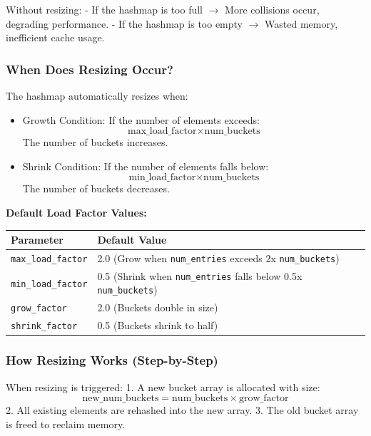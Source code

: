 \documentclass[titlepage]{article}
\begin{document}
Without resizing:
- If the hashmap is too full $\rightarrow$ More collisions occur, degrading performance.
- If the hashmap is too empty $\rightarrow$ Wasted memory, inefficient cache usage.

\subsubsection{When Does Resizing Occur?}
The hashmap automatically resizes when:
\begin{itemize}
    \item Growth Condition: If the number of elements exceeds:
    \[
    \text{max\_load\_factor} \times \text{num\_buckets}
    \]
    The number of buckets increases.
    \item Shrink Condition: If the number of elements falls below:
    \[
    \text{min\_load\_factor} \times \text{num\_buckets}
    \]
    The number of buckets decreases.
\end{itemize}

\textbf{Default Load Factor Values:}
\begin{center}
\begin{tabular}{@{} l l @{} }
\toprule
\textbf{Parameter} & \textbf{Default Value} \\
\midrule
\texttt{max\_load\_factor} & 2.0 (Grow when \texttt{num\_entries} exceeds 2x \texttt{num\_buckets}) \\
\texttt{min\_load\_factor} & 0.5 (Shrink when \texttt{num\_entries} falls below 0.5x \texttt{num\_buckets}) \\
\texttt{grow\_factor} & 2.0 (Buckets double in size) \\
\texttt{shrink\_factor} & 0.5 (Buckets shrink to half) \\
\bottomrule
\end{tabular}
\end{center}

\subsubsection{How Resizing Works (Step-by-Step)}
When resizing is triggered:
1. A new bucket array is allocated with size:
   \[
   \text{new\_num\_buckets} = \text{num\_buckets} \times \text{grow\_factor}
   \]
2. All existing elements are rehashed into the new array.
3. The old bucket array is freed to reclaim memory.
\end{document}
